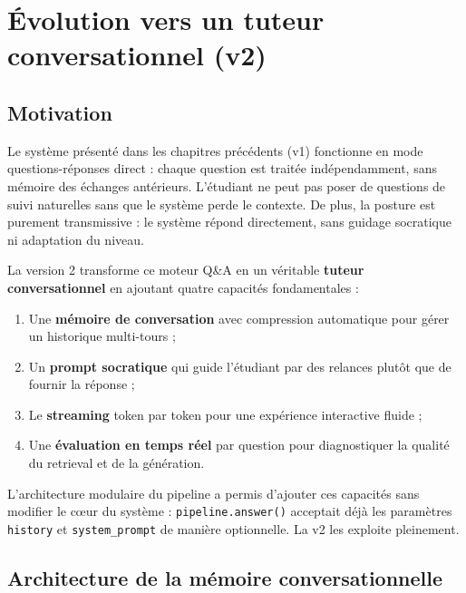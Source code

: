 \section{Évolution vers un tuteur conversationnel (v2)}
\label{sec:tuteur-v2}

\subsection{Motivation}

Le système présenté dans les chapitres précédents (v1) fonctionne en mode questions-réponses direct : chaque question est traitée indépendamment, sans mémoire des échanges antérieurs. L'étudiant ne peut pas poser de questions de suivi naturelles sans que le système perde le contexte. De plus, la posture est purement transmissive : le système répond directement, sans guidage socratique ni adaptation du niveau.

La version 2 transforme ce moteur Q\&A en un véritable \textbf{tuteur conversationnel} en ajoutant quatre capacités fondamentales :

\begin{enumerate}
  \item Une \textbf{mémoire de conversation} avec compression automatique pour gérer un historique multi-tours ;
  \item Un \textbf{prompt socratique} qui guide l'étudiant par des relances plutôt que de fournir la réponse ;
  \item Le \textbf{streaming} token par token pour une expérience interactive fluide ;
  \item Une \textbf{évaluation en temps réel} par question pour diagnostiquer la qualité du retrieval et de la génération.
\end{enumerate}

L'architecture modulaire du pipeline a permis d'ajouter ces capacités sans modifier le cœur du système : \texttt{pipeline.answer()} acceptait déjà les paramètres \texttt{history} et \texttt{system\_prompt} de manière optionnelle. La v2 les exploite pleinement.

\subsection{Architecture de la mémoire conversationnelle}
\label{sec:memoire-archi}

